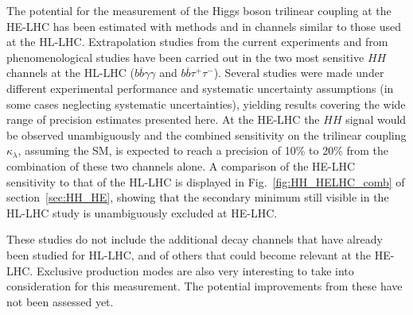 \documentclass[../report.tex]{subfiles}
\begin{document}

The potential for the measurement of the Higgs boson trilinear coupling at the HE-LHC has been estimated with methods and in channels similar to those used at the HL-LHC. Extrapolation studies from the current experiments and from phenomenological studies have been carried out in the two most sensitive $HH$ channels at the HL-LHC ($b\overline{b}\gamma\gamma$ and $b\overline{b}\tau^+\tau^-$). 
Several studies were made under different experimental performance and systematic uncertainty assumptions (in some cases neglecting systematic uncertainties), yielding results covering the wide range of precision estimates presented here. At the HE-LHC the $HH$ signal would be observed unambiguously and the combined sensitivity on the trilinear coupling $\kappa_{\lambda}$, assuming the SM, is expected to reach a precision of 10\% to 20\% from the combination of these two channels alone. A comparison of the HE-LHC sensitivity to that of the HL-LHC is displayed in Fig.~\ref{fig:HH_HELHC_comb} of section~\ref{sec:HH_HE}, showing that the secondary minimum still visible in the HL-LHC study is unambiguously excluded at HE-LHC. 

These studies do not include the additional decay channels that have already been studied for HL-LHC, and of others that could become relevant at the HE-LHC. Exclusive production modes are also very interesting to take into consideration for this measurement. The potential improvements from these have not been assessed yet.
\end{document}
